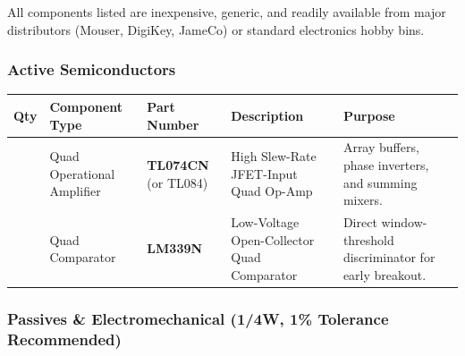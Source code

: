 \documentclass[
]{article}
\begin{document}
All components listed are inexpensive, generic, and readily available
from major distributors (Mouser, DigiKey, JameCo) or standard
electronics hobby bins.

\subsubsection{Active Semiconductors}\label{active-semiconductors}

\begin{longtable}[]{@{}
  >{\raggedright\arraybackslash}p{}
  >{\raggedright\arraybackslash}p{}
  >{\raggedright\arraybackslash}p{}
  >{\raggedright\arraybackslash}p{}
  >{\raggedright\arraybackslash}p{}@{}}
\toprule\noalign{}
\begin{minipage}[b]{\linewidth}\raggedright
Qty
\end{minipage} & \begin{minipage}[b]{\linewidth}\raggedright
Component Type
\end{minipage} & \begin{minipage}[b]{\linewidth}\raggedright
Part Number
\end{minipage} & \begin{minipage}[b]{\linewidth}\raggedright
Description
\end{minipage} & \begin{minipage}[b]{\linewidth}\raggedright
Purpose
\end{minipage} \\
\midrule\noalign{}
\endhead
\bottomrule\noalign{}
\endlastfoot
2 & Quad Operational Amplifier & \textbf{TL074CN} (or TL084) & High
Slew-Rate JFET-Input Quad Op-Amp & Array buffers, phase inverters, and
summing mixers. \\
1 & Quad Comparator & \textbf{LM339N} & Low-Voltage Open-Collector Quad
Comparator & Direct window-threshold discriminator for early
breakout. \\
\end{longtable}

\subsubsection{Passives \& Electromechanical (1/4W, 1\% Tolerance
Recommended)}\label{passives-electromechanical-14w-1-tolerance-recommended}
\end{document}
